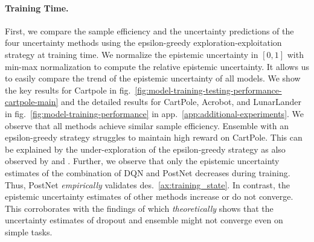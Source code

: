 \paragraph{Training Time.} First, we compare the sample efficiency and the uncertainty predictions of the four uncertainty methods using the epsilon-greedy exploration-exploitation strategy at training time. We normalize the epistemic uncertainty in $[0, 1]$ with min-max normalization to compute the relative epistemic uncertainty. It allows us to easily compare the trend of the epistemic uncertainty of all models. We show the key results for Cartpole in fig.~\ref{fig:model-training-testing-performance-cartpole-main} and the detailed results for CartPole, Acrobot, and LunarLander in fig.~\ref{fig:model-training-performance} in app.~\ref{app:additional-experiments}. We observe that all methods achieve similar sample efficiency. Ensemble with an epsilon-greedy strategy struggles to maintain high reward on CartPole. This can be explained by the under-exploration of the epsilon-greedy strategy as also observed by \citet{randomized-prior-functions} and \citet{dropout}. Further, we observe that only the epistemic uncertainty estimates of the combination of DQN and PostNet decreases during training. Thus, PostNet \emph{empirically} validates des.~\ref{ax:training_state}. In contrast, the epistemic uncertainty estimates of other methods increase or do not converge. This corroborates with the findings of \cite{randomized-prior-functions} which \emph{theoretically} shows that the uncertainty estimates of dropout and ensemble might not converge even on simple tasks.

